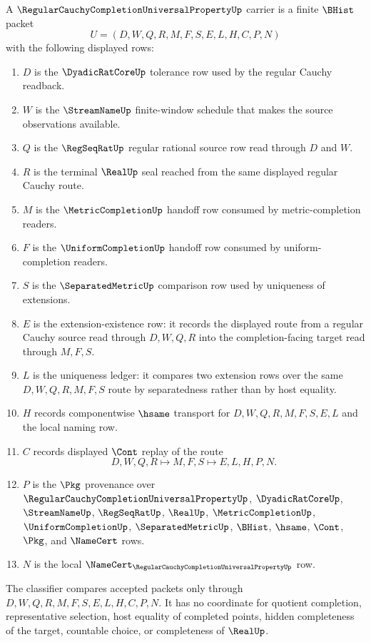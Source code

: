 \begin{definition}
\label{def:regular-cauchy-completion-universal-property-carrier}
A $\RegularCauchyCompletionUniversalPropertyUp$ carrier is a finite $\BHist$ packet
$$
U=(D,W,Q,R,M,F,S,E,L,H,C,P,N)
$$
with the following displayed rows:
\begin{enumerate}
\item $D$ is the $\DyadicRatCoreUp$ tolerance row used by the regular Cauchy readback.
\item $W$ is the $\StreamNameUp$ finite-window schedule that makes the source observations available.
\item $Q$ is the $\RegSeqRatUp$ regular rational source row read through $D$ and $W$.
\item $R$ is the terminal $\RealUp$ seal reached from the same displayed regular Cauchy route.
\item $M$ is the $\MetricCompletionUp$ handoff row consumed by metric-completion readers.
\item $F$ is the $\UniformCompletionUp$ handoff row consumed by uniform-completion readers.
\item $S$ is the $\SeparatedMetricUp$ comparison row used by uniqueness of extensions.
\item $E$ is the extension-existence row: it records the displayed route from a regular Cauchy source read through $D,W,Q,R$ into the completion-facing target read through $M,F,S$.
\item $L$ is the uniqueness ledger: it compares two extension rows over the same $D,W,Q,R,M,F,S$ route by separatedness rather than by host equality.
\item $H$ records componentwise $\hsame$ transport for $D,W,Q,R,M,F,S,E,L$ and the local naming row.
\item $C$ records displayed $\Cont$ replay of the route
$$
D,W,Q,R \longmapsto M,F,S \longmapsto E,L,H,P,N .
$$
\item $P$ is the $\Pkg$ provenance over $\RegularCauchyCompletionUniversalPropertyUp$, $\DyadicRatCoreUp$, $\StreamNameUp$, $\RegSeqRatUp$, $\RealUp$, $\MetricCompletionUp$, $\UniformCompletionUp$, $\SeparatedMetricUp$, $\BHist$, $\hsame$, $\Cont$, $\Pkg$, and $\NameCert$ rows.
\item $N$ is the local $\NameCert_{\RegularCauchyCompletionUniversalPropertyUp}$ row.
\end{enumerate}
The classifier compares accepted packets only through $D,W,Q,R,M,F,S,E,L,H,C,P,N$. It has no coordinate for quotient completion, representative selection, host equality of completed points, hidden completeness of the target, countable choice, or completeness of $\RealUp$.
\end{definition}

